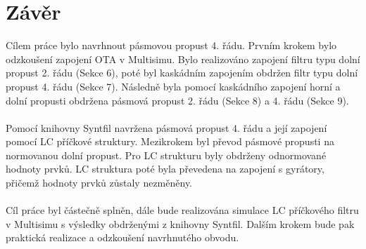 \documentclass[twoside]{article}
\begin{document}
\section{Závěr}
\noindent Cílem práce bylo navrhnout pásmovou propust 4. řádu. Prvním krokem bylo odzkoušení zapojení OTA v Multisimu. Bylo realizováno zapojení filtru typu dolní propust 2. řádu (Sekce 6), poté byl kaskádním zapojením obdržen filtr typu dolní propust 4. řádu (Sekce 7). Následně byla pomocí kaskádního zapojení horní a dolní propusti obdržena pásmová propust 2. řádu (Sekce 8) a 4. řádu (Sekce 9).\\
\\
Pomocí knihovny Syntfil navržena pásmová propust 4. řádu a její zapojení pomocí LC příčkové struktury. Mezikrokem byl převod pásmové propusti na normovanou dolní propust. Pro LC strukturu byly obdrženy odnormované hodnoty prvků. LC struktura poté byla převedena na zapojení s gyrátory, přičemž hodnoty prvků zůstaly nezměněny.\\
\\
Cíl práce byl částečně splněn, dále bude realizována simulace LC příčkového filtru v Multisimu s výsledky obdrženými z knihovny Syntfil. Dalším krokem bude pak praktická realizace a odzkoušení navrhnutého obvodu.
\newpage
\end{document}
